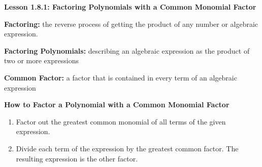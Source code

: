 \begin{center}
\textbf{Lesson 1.8.1: Factoring Polynomials with a Common Monomial Factor}
\end{center}

\vspace*{1ex}

\textbf{Factoring:} the reverse process of getting the product of any number or algebraic expression.

\textbf{Factoring Polynomials:} describing an algebraic expression as the product of two or more expressions

\textbf{Common Factor:} a factor that is contained in every term of an algebraic expression 

\textbf{How to Factor a Polynomial with a Common Monomial Factor}
    	\begin{enumerate}
    		\item Factor out the greatest common monomial of all terms of the given expression.
    		\item Divide each term of the expression by the greatest common factor. The resulting expression is the other factor.
    	\end{enumerate} 
